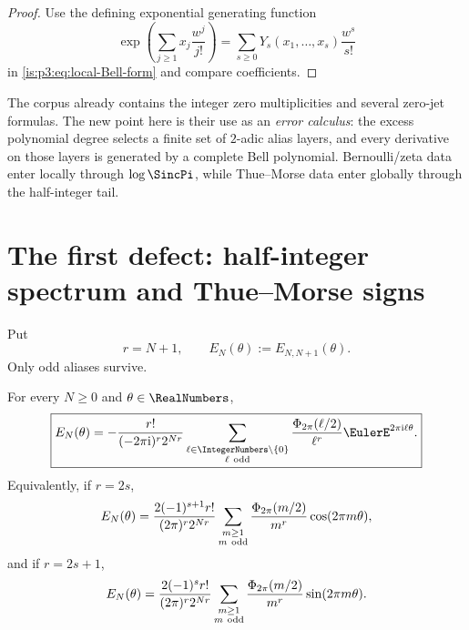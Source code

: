 \begin{proof}
Use the defining exponential generating function
\[
 \exp\!\left(\sum_{j\ge1}x_j\frac{w^j}{j!}\right)
 =\sum_{s\ge0}Y_s(x_1,\ldots,x_s)\frac{w^s}{s!}
\]
in \eqref{is:p3:eq:local-Bell-form} and compare coefficients.
\end{proof}

\begin{resultbox}
The corpus already contains the integer zero multiplicities and several zero-jet formulas.  The new point here is their use as an \emph{error calculus}: the excess polynomial degree selects a finite set of $2$-adic alias layers, and every derivative on those layers is generated by a complete Bell polynomial.  Bernoulli/zeta data enter locally through $\log\SincPi$, while Thue--Morse data enter globally through the half-integer tail.
\end{resultbox}

\section{The first defect: half-integer spectrum and Thue--Morse signs}
\label{is:p3:sec:first-defect}

Put
\begin{equation}
 r=N+1,
 \qquad
 E_N(\theta):=E_{N,N+1}(\theta).
 \label{is:p3:eq:first-defect-def}
\end{equation}
Only odd aliases survive.

\begin{theorem}
\label{is:p3:thm:first-defect}
For every $N\ge0$ and $\theta\in\RealNumbers$,
\begin{equation}
 \boxed{\displaystyle
 E_N(\theta)
 =-\frac{r!}{(-2\pi\iu)^r2^{Nr}}
 \sum_{\substack{\ell\in\IntegerNumbers\setminus\{0\}\\\ell\ \mathrm{odd}}}
 \frac{\PhiCyc(\ell/2)}{\ell^r}
 \EulerE^{2\pi\iu\ell\theta}.}
 \label{is:p3:eq:first-defect-complex}
\end{equation}
Equivalently, if $r=2s$,
\begin{equation}
 E_N(\theta)
 =\frac{2(-1)^{s+1}r!}{(2\pi)^r2^{Nr}}
 \sum_{\substack{m\ge1\\m\ \mathrm{odd}}}
 \frac{\Phi_{2\pi}(m/2)}{m^r}\cos(2\pi m\theta),
 \label{is:p3:eq:first-defect-even}
\end{equation}
and if $r=2s+1$,
\begin{equation}
 E_N(\theta)
 =\frac{2(-1)^sr!}{(2\pi)^r2^{Nr}}
 \sum_{\substack{m\ge1\\m\ \mathrm{odd}}}
 \frac{\Phi_{2\pi}(m/2)}{m^r}\sin(2\pi m\theta).
 \label{is:p3:eq:first-defect-odd}
\end{equation}
\end{theorem}

